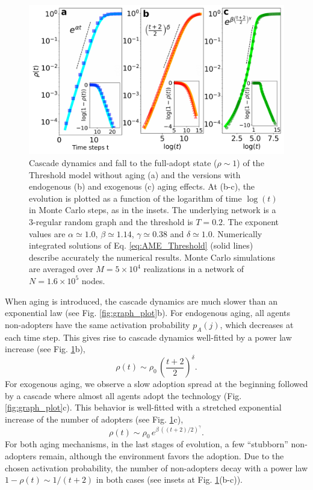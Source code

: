\begin{figure}
\includegraphics[width=\columnwidth]{Figs/Aging_Threshold/EVO_MOD.pdf}
\caption[Cascade dynamics and fall to the full-adopt state ($\rho \sim 1$)]{\label{fig:models} Cascade dynamics and fall to the full-adopt state ($\rho \sim 1$) of the Threshold model without aging (a) and the versions with endogenous (b) and exogenous (c) aging effects. At (b-c), the evolution is plotted as a function of the logarithm of time $\log{(t)}$ in Monte Carlo steps, as in the insets. The underlying network is a 3-regular random graph and the threshold is $T = 0.2$. The exponent values are $\alpha \simeq 1.0$, $\beta \simeq 1.14$, $\gamma \simeq 0.38$ and $\delta \simeq 1.0$. Numerically integrated solutions of Eq. \eqref{eq:AME_Threshold} (solid lines) describe accurately the numerical results. Monte Carlo simulations are averaged over $M = 5 \times 10^4$ realizations in a network of $N = 1.6 \times 10^5$ nodes.}
\end{figure}

When aging is introduced, the cascade dynamics are much slower than an exponential law (see Fig. \ref{fig:graph_plot}b). For endogenous aging, all agents non-adopters have the same activation probability $p_A(j)$, which decreases at each time step. This gives rise to cascade dynamics well-fitted by a power law increase (see Fig. \ref{fig:models}b),
\begin{equation}
\rho(t) \sim \rho_0 \, \left( \frac{t + 2}{2}\right)^\delta .
\label{eq:power law}
\end{equation}
For exogenous aging, we observe a slow adoption spread at the beginning followed by a cascade where almost all agents adopt the technology (Fig. \ref{fig:graph_plot}c). This behavior is well-fitted with a stretched exponential increase of the number of adopters (see Fig. \ref{fig:models}c),
\begin{equation}
\rho(t) \sim  \rho_0\,  e^{\beta \, ((t + 2) / 2)^{\gamma}} .
\label{eq:streched_exp}
\end{equation}
For both aging mechanisms, in the last stages of evolution, a few ``stubborn'' non-adopters remain, although the environment favors the adoption. Due to the chosen activation probability, the number of non-adopters decay with a power law $1 - \rho(t) \sim 1/(t+2)$ in both cases (see insets at Fig. \ref{fig:models}(b-c)).

